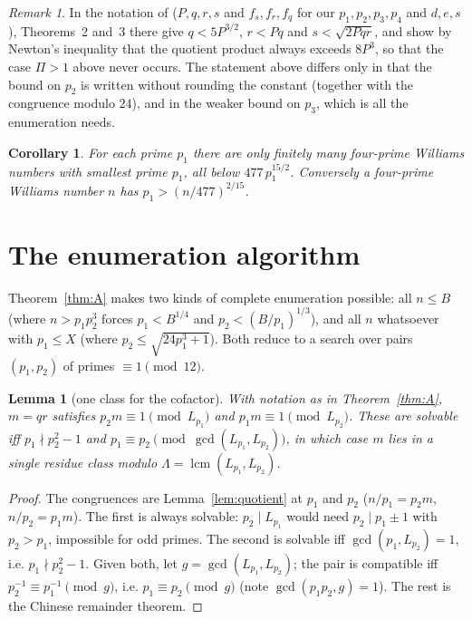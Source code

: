 \documentclass[11pt]{amsart}
\newtheorem{lemma}[theorem]{Lemma}
\newtheorem{corollary}[theorem]{Corollary}
\theoremstyle{definition}
\theoremstyle{remark}
\newtheorem{remark}[theorem]{Remark}
\providecommand{\lcm}{\operatorname{lcm}}
\begin{document}
\begin{remark}
In the notation of \cite{MD15} ($P,q,r,s$ and $f_s,f_r,f_q$ for our $p_1,p_2,p_3,p_4$ and $d,e,s$), Theorems~2 and~3 there give $q<5P^{3/2}$, $r<Pq$ and $s<\sqrt{2Pqr}$, and show by Newton's inequality that the quotient product always exceeds $8P^3$, so that the case $\Pi>1$ above never occurs. The statement above differs only in that the bound on $p_2$ is written without rounding the constant (together with the congruence modulo $24$), and in the weaker bound on $p_3$, which is all the enumeration needs.
\end{remark}

\begin{corollary}\label{cor:A}
For each prime $p_1$ there are only finitely many four-prime Williams numbers with smallest prime $p_1$, all below $477\,p_1^{15/2}$. Conversely a four-prime Williams number $n$ has $p_1>(n/477)^{2/15}$.
\end{corollary}

\section{The enumeration algorithm}\label{sec:alg}

Theorem~\ref{thm:A} makes two kinds of complete enumeration possible: all $n\le B$ (where $n>p_1p_2^3$ forces $p_1<B^{1/4}$ and $p_2<(B/p_1)^{1/3}$), and all $n$ whatsoever with $p_1\le X$ (where $p_2\le\sqrt{24p_1^3+1}$). Both reduce to a search over pairs $(p_1,p_2)$ of primes $\equiv1\pmod{12}$.

\begin{lemma}[one class for the cofactor]\label{lem:crt}
With notation as in Theorem~\ref{thm:A}, $m=qr$ satisfies $p_2m\equiv1\pmod{L_{p_1}}$ and $p_1m\equiv1\pmod{L_{p_2}}$. These are solvable iff $p_1\nmid p_2^2-1$ and $p_1\equiv p_2\pmod{\gcd(L_{p_1},L_{p_2})}$, in which case $m$ lies in a single residue class modulo $\Lambda=\lcm(L_{p_1},L_{p_2})$.
\end{lemma}
\begin{proof}
The congruences are Lemma~\ref{lem:quotient} at $p_1$ and $p_2$ ($n/p_1=p_2m$, $n/p_2=p_1m$). The first is always solvable: $p_2\mid L_{p_1}$ would need $p_2\mid p_1\pm1$ with $p_2>p_1$, impossible for odd primes. The second is solvable iff $\gcd(p_1,L_{p_2})=1$, i.e. $p_1\nmid p_2^2-1$. Given both, let $g=\gcd(L_{p_1},L_{p_2})$; the pair is compatible iff $p_2^{-1}\equiv p_1^{-1}\pmod g$, i.e. $p_1\equiv p_2\pmod g$ (note $\gcd(p_1p_2,g)=1$). The rest is the Chinese remainder theorem.
\end{proof}
\end{document}

